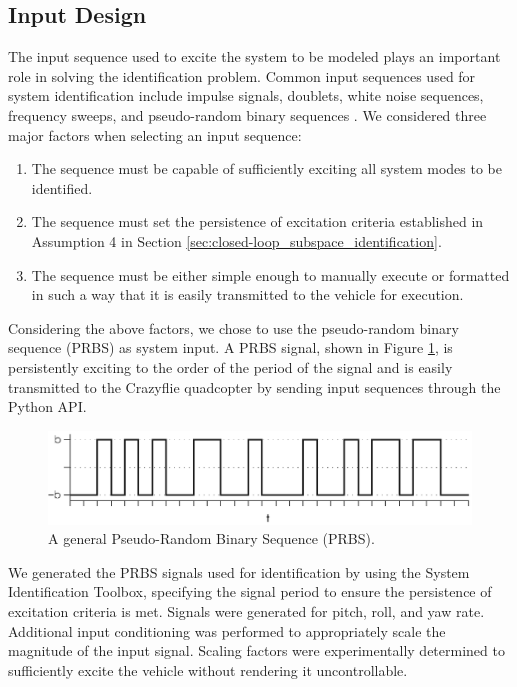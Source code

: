 \subsection{Input Design}
The input sequence used to excite the system to be modeled plays an important role in solving the identification problem. Common input sequences used for system identification include impulse signals, doublets, white noise sequences, frequency sweeps, and pseudo-random binary sequences \cite{verhaegen2007filtering}. We considered three major factors when selecting an input sequence:
\begin{enumerate}
\item The sequence must be capable of sufficiently exciting all system modes to be identified.
\item The sequence must set the persistence of excitation criteria established in Assumption 4 in Section \ref{sec:closed-loop_subspace_identification}.
\item The sequence must be either simple enough to manually execute or formatted in such a way that it is easily transmitted to the vehicle for execution.  
\end{enumerate}
Considering the above factors, we chose to use the pseudo-random binary sequence (PRBS) as system input. A PRBS signal, shown in Figure \ref{fig:general_prbs}, is persistently exciting to the order of the period of the signal \cite{wilson2005understanding} and is easily transmitted to the Crazyflie quadcopter by sending input sequences through the Python API.
\begin{figure}[htb!]
	\centering
	\includegraphics{../fig/general_prbs.eps}
	\caption{A general Pseudo-Random Binary Sequence (PRBS).}
	\label{fig:general_prbs}
\end{figure}

We generated the PRBS signals used for identification by using the \matlab System Identification Toolbox, specifying the signal period to ensure the persistence of excitation criteria is met. Signals were generated for pitch, roll, and yaw rate. Additional input conditioning was performed to appropriately scale the magnitude of the input signal. Scaling factors were experimentally determined to sufficiently excite the vehicle without rendering it uncontrollable.

